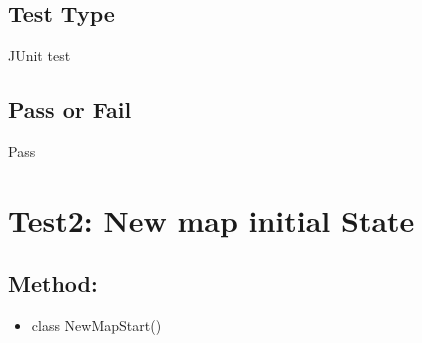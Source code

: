 \documentclass[11pt, a4paper]{report}
\begin{document}
\subsection{Test Type}
JUnit test
\subsection{Pass or Fail}
Pass

\section{Test2: New map initial State}
\subsection{Method:}
\begin{itemize}
\item class NewMapStart()
\end{itemize}
\end{document}
